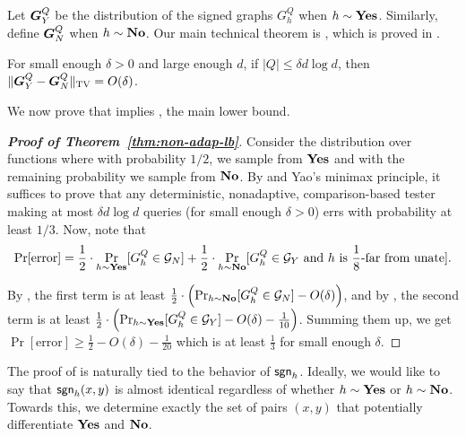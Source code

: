 Let $\boldsymbol{G}^Q_Y$ be the distribution of the signed graphs $G^Q_h$ when $h\sim \mathbf{Yes}$. Similarly, define $\boldsymbol{G}^Q_N$ when $h\sim \mathbf {No}$. Our main technical theorem is , which is proved in .
\begin{theorem}\label{thm:tv}
For small enough $\delta > 0$ and large
enough $d$, if $|Q| \leq \delta d\log d$, then $\|\boldsymbol{G}^Q_Y - \boldsymbol{G}^Q_N\|_{\mathrm{TV}} = O(\delta)$.
\end{theorem}

\noindent We now prove that  implies , the main lower bound.

\begin{proof}[{\bf Proof of Theorem~\ref{thm:non-adap-lb}}]
	Consider the distribution over functions where with probability $1/2$, we sample from $\mathbf{Yes}$ and with the remaining probability we sample from $\mathbf {No}$.
	By  and Yao's minimax principle,
it suffices to prove that any deterministic, nonadaptive, comparison-based tester making
at most $\delta d\log d$ queries (for small enough $\delta > 0$) errs with probability at least $ 1/3$. Now, note that
%
\begin{align*}
\Pr[\textrm{error}] = \frac{1}{2} \cdot \Pr_{h\sim \mathbf{Yes}} [G^Q_h \in \mathcal{G}_N] 
	+ \frac{1}{2} \cdot \Pr_{h\sim \mathbf {No}} [G^Q_h \in \mathcal{G}_Y \text{ and } h \ \textrm{is $\frac{1}{8}$-far from unate}].
\end{align*}

\noindent By , the first term is at least $\frac{1}{2}\cdot \left(\Pr_{h\sim \mathbf {No}} [G^Q_h \in \mathcal{G}_N]  - O(\delta) \right)$, and by ,
	the second term is at least $\frac{1}{2}\cdot \left(\Pr_{h\sim \mathbf{Yes}} [G^Q_h \in \mathcal{G}_Y] -O(\delta) - \frac{1}{10}\right)$. Summing them up, we get
$\Pr[\textrm{error}] \geq \frac{1}{2} - O(\delta) - \frac{1}{20}$ which is at least $\frac 1 3$ for small enough $\delta$.
\end{proof}

The proof of  is naturally tied to the behavior of $\mathsf{sgn}_h$.
Ideally, we would like to say that $\mathsf{sgn}_h(x,y)$ is almost identical
regardless of whether $h \sim \mathbf{Yes}$ or $h \sim \mathbf {No}$. Towards this,
we determine exactly the set of pairs $(x,y)$ that potentially
differentiate $\mathbf{Yes}$ and $\mathbf {No}$.

\begin{claim}\label{clm:inv}
\end{claim}

